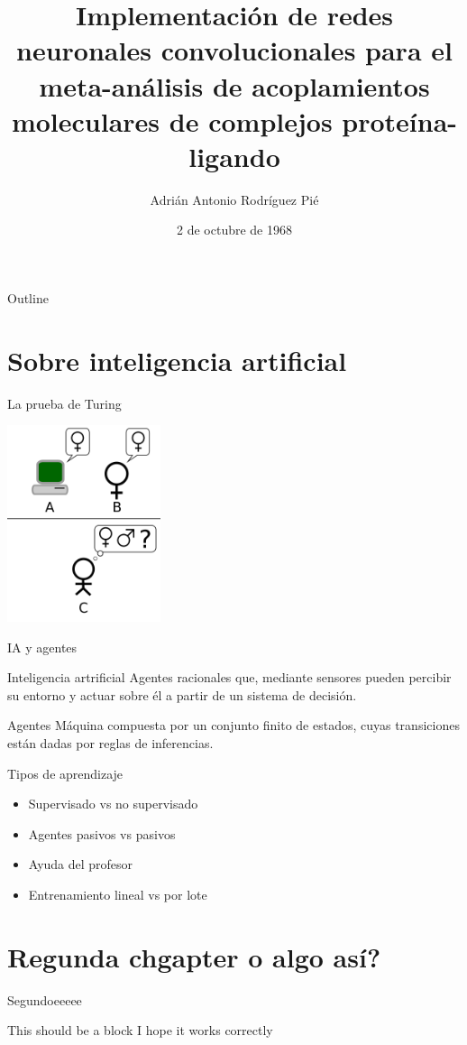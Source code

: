 \documentclass[presentation]{beamer}
\institute{Universidad Nacional Autónoma de México}
\author{Adrián Antonio Rodríguez Pié}
\date{2 de octubre de 1968}
\title{Implementación de redes neuronales convolucionales para el meta-análisis de acoplamientos moleculares de complejos proteína-ligando}
\begin{document}
\maketitle
\begin{frame}{Outline}
\tableofcontents
\end{frame}



\section{Sobre inteligencia artificial}
\label{sec:org92ad795}
\begin{frame}[label={sec:orge7ef6c1}]{La prueba de Turing}
\begin{center}
\includegraphics[width=170px]{images/turing-test.png}
\end{center}
\end{frame}
\begin{frame}[label={sec:orgd4b6aa2}]{IA y agentes}
\begin{block}{Inteligencia artrificial}
\alert{\alert{Agentes racionales}} que, mediante \alert{\alert{sensores}} pueden
percibir su \alert{\alert{entorno}} y actuar sobre él a partir de un
sistema de decisión.
\pause
\end{block}
\begin{block}{Agentes}
Máquina compuesta por un conjunto finito de estados, cuyas
transiciones están dadas por reglas de inferencias.
\end{block}
\end{frame}
\begin{frame}[label={sec:org9e02f30}]{Tipos de aprendizaje}
\begin{itemize}
\item Supervisado vs no supervisado
\item Agentes pasivos vs pasivos
\item Ayuda del profesor
\item Entrenamiento lineal vs por lote
\end{itemize}
\end{frame}
\section{Regunda chgapter o algo así?}
\label{sec:org4169104}
\begin{frame}[label={sec:org0934856}]{Segundoeeeee}
\begin{block}{This should be a block}
I hope it works correctly
\end{block}
\end{frame}
\end{document}

